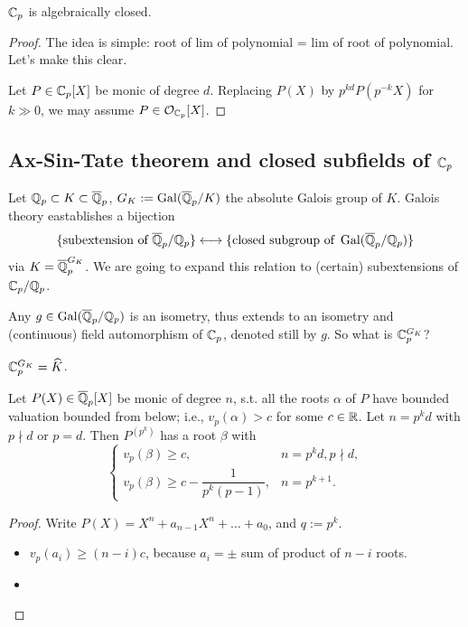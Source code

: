 \begin{theorem}
    $\mathbb{C}_p$ is algebraically closed.
\end{theorem}
\begin{proof}
    The idea is simple: root of lim of polynomial = lim of root of polynomial. Let's make this clear.

    Let $P\in \mathbb{C}_p[X]$ be monic of degree $d$.
    Replacing $P(X)$ by $p^{kd}P(p^{-k} X)$ for $k\gg 0$, we may assume $P\in\mathcal{O}_{\mathbb{C}_p}[X]$.


\end{proof}

\subsection{Ax-Sin-Tate theorem and closed subfields of \texorpdfstring{$\mathbb{C}_p$}{Cp}}
Let $\mathbb{Q}_p\subset K\subset\overline{\mathbb{Q}}_p$, $G_K := \operatorname{Gal}(\overline{\mathbb{Q}}_p/K)$ the absolute Galois group of $K$.
Galois theory eastablishes a bijection \[
    \{\text{subextension of }\overline{\mathbb{Q}}_p/\mathbb{Q}_p\}\longleftrightarrow
    \{\text{closed subgroup of }\operatorname{Gal}(\overline{\mathbb{Q}}_p/\mathbb{Q}_p)\}
\] via $K = \overline{\mathbb{Q}}_p^{G_K}$.
We are going to expand this relation to (certain) subextensions of $\mathbb{C}_p/\mathbb{Q}_p$.

Any $g\in\operatorname{Gal}(\overline{\mathbb{Q}}_p/\mathbb{Q}_p)$ is an isometry, thus extends to an isometry and (continuous) field automorphism of $\mathbb{C}_p$, denoted still by $g$.
So what is $\mathbb{C}_p^{G_K}$?
\begin{theorem}
    $\mathbb{C}_p^{G_K} = \widehat K$.
\end{theorem}

\begin{lemma}
    Let $P(X)\in\overline{\mathbb{Q}}_p[X]$ be monic of degree $n$,
    s.t. all the roots $\alpha$ of $P$ have bounded valuation bounded from below; i.e., $v_p(\alpha) > c$ for some $c\in\mathbb{R}$.
    Let $n = p^kd$ with $p\nmid d$ or $p = d$.
    Then $P^{(p^k)}$ has a root $\beta$ with \[\begin{cases}
        v_p(\beta)\ge c, &n = p^kd, p\nmid d,\\ 
        v_p(\beta)\ge c - \dfrac{1}{p^k(p-1)},
        &n = p^{k+1}.
    \end{cases}\]
\end{lemma}
\begin{proof}
    Write $P(X) = X^n + a_{n-1}X^n + \dots + a_0$, and $q := p^k$.
    \begin{itemize}
        \item $v_p(a_i)\ge (n-i)c$, because $a_i = \pm$ sum of product of $n - i$ roots.
        \item 
    \end{itemize}
\end{proof}
